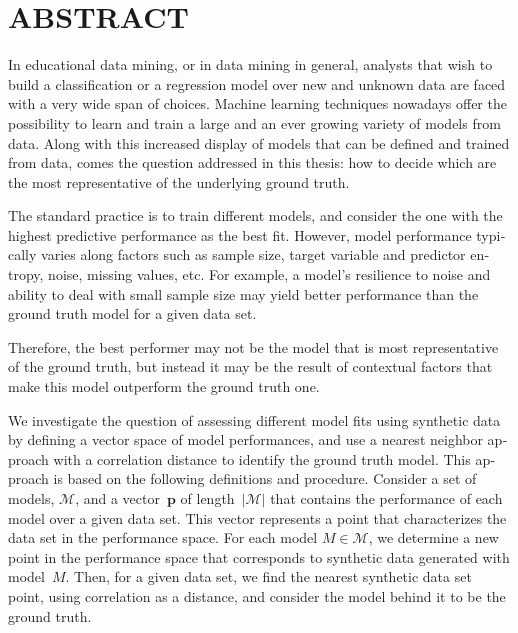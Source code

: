 %

\chapter*{ABSTRACT}\thispagestyle{headings}
%
\begin{otherlanguage}{english}

In educational data mining, or in data mining in general, analysts that wish to build a classification or a regression model over new and unknown data are faced with a very wide span of choices.  Machine learning techniques nowadays offer the possibility to learn and train a large and an ever growing variety of models from data. Along with this increased display of models that can be defined and trained from data, comes the question addressed in this thesis: how to decide which are the most representative of the underlying ground truth.

The standard practice is to train different models, and consider the one with the highest predictive performance as the best fit. However, model performance typically varies along factors such as sample size, target variable and predictor entropy, noise, missing values, etc.  For example, a model's resilience to noise and ability to deal with small sample size may yield better performance than the ground truth model for a given data set.  

Therefore, the best performer may not be the model that is most representative of the ground truth, but instead it may be the result of contextual factors that make this model outperform the ground truth one.  

We investigate the question of assessing different model fits using synthetic data by defining a vector space of model performances, and use a nearest neighbor approach with a correlation distance to identify the ground truth model.  This approach is based on the following definitions and procedure.  Consider a set of models, $\mathcal{M}$, and a vector~$\mathbf{p}$ of length~$|\mathcal{M}|$ that contains the performance of each model over a given data set.  This vector represents a point that characterizes the data set in the performance space.  For each model $M \in \mathcal{M}$, we determine a new point in the performance space that corresponds to synthetic data generated with model~$M$.  Then, for a given data set, we find the nearest synthetic data set point, using correlation as a distance, and consider the model behind it to be the ground truth.


\end{otherlanguage}
